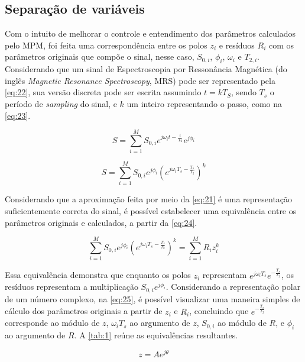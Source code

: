 \documentclass[12pt]{article}
\begin{document}
\subsection{Separação de variáveis}

Com o intuito de melhorar o controle e entendimento dos parâmetros calculados pelo MPM, foi feita uma correspondência entre os polos $z_i$ e resíduos $R_i$ com
os parâmetros originais que compõe o sinal, nesse caso, $S_{0, i}$, $\phi_i$, $\omega_i$ e $T_{2, i}$. Considerando que um sinal de Espectroscopia por Ressonância Magnética 
(do inglês \textit{Magnetic Resonance Spectroscopy}, MRS) pode ser representado pela \autoref{eq:22}, sua versão discreta pode ser escrita assumindo $t = kT_S$, sendo $T_s$ 
o período de \textit{sampling} do sinal, e $k$ um inteiro representando o passo, como na \autoref{eq:23}.

\begin{equation} \label{eq:22}
    S = \sum_{i=1}^{M} S_{0, i} e^{j\omega_i t -\frac{t}{T_2}}e^{j \phi_i} 
\end{equation}

\begin{equation} \label{eq:23}
    S = \sum_{i=1}^{M} S_{0, i} e^{j \phi_i}  (e^{j\omega_i T_s -\frac{T_s}{T_2}})^k 
\end{equation}

Considerando que a aproximação feita por meio da \autoref{eq:21} é uma representação suficientemente correta do sinal, é possível estabelecer uma equivalência 
entre os parâmetros originais e calculados, a partir da \autoref{eq:24}.

\begin{equation} \label{eq:24}
    \sum_{i=1}^{M} S_{0, i} e^{j \phi_i}  (e^{j\omega_i T_s -\frac{T_s}{T_2}})^k  = \sum_{i = 1}^{M} R_i z_i^{k}
\end{equation}

Essa equivalência demonstra que enquanto os polos $z_i$ representam $e^{j\omega_i T_s} e^{-\frac{T_s}{T_2}}$, os resíduos representam a multiplicação 
$S_{0, i} e^{j \phi_i}$. Considerando a representação polar de um número complexo, na \autoref{eq:25}, é possível visualizar uma maneira simples de 
cálculo dos parâmetros originais a partir de $z_i$ e $R_i$, concluindo que $e^{-\frac{T_s}{T_2}}$ corresponde ao módulo de $z$, $\omega_i T_s$ ao argumento de $z$,
$S_{0, i}$ ao módulo de $R$, e $\phi_i$ ao argumento de $R$. A \autoref{tab:1} reúne as equivalências resultantes.

\begin{equation} \label{eq:25}
    z = A e^{j \theta}    
\end{equation}
\end{document}
